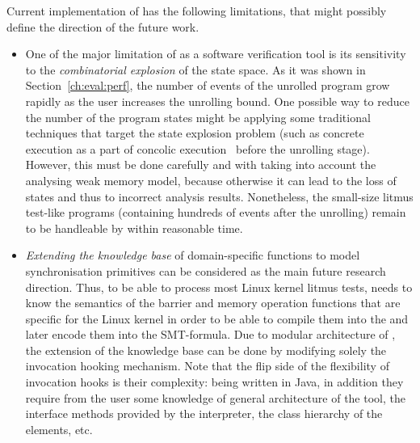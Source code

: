 Current implementation of \porthos[2] has the following limitations, that might possibly define the direction of the future work.

\begin{itemize}[leftmargin=\parindent]
\item One of the major limitation of \porthos[2] as a software verification tool is its sensitivity to the \textit{combinatorial explosion} of the state space.
As it was shown in Section~\ref{ch:eval:perf}, the number of events of the unrolled program grow rapidly as the user increases the unrolling bound.
One possible way to reduce the number of the program states might be applying some traditional techniques that target the state explosion problem (such as concrete execution as a part of concolic execution~\cite{majumdar2007hybrid} before the unrolling stage).
However, this must be done carefully and with taking into account the analysing weak memory model, because otherwise it can lead to the loss of states and thus to incorrect analysis results.
Nonetheless, the small-size litmus test-like programs (containing hundreds of events after the unrolling) remain to be handleable by \porthos[2] within reasonable time.


\item \textit{Extending the knowledge base} of domain-specific functions to model synchronisation primitives can be considered as the main future research direction.
Thus, to be able to process most Linux kernel litmus tests, \porthos[2] needs to know the semantics of the barrier and memory operation functions that are specific for the Linux kernel in order to be able to compile them into the \xgraph{} and later encode them into the SMT-formula.
Due to modular architecture of \porthos[2], the extension of the knowledge base can be done by modifying solely the invocation hooking mechanism.
Note that the flip side of the flexibility of invocation hooks is their complexity: being written in Java, in addition they require from the user some knowledge of general architecture of the tool, the interface methods provided by the interpreter, the class hierarchy of the \xgraph{} elements, etc.


\end{itemize}
